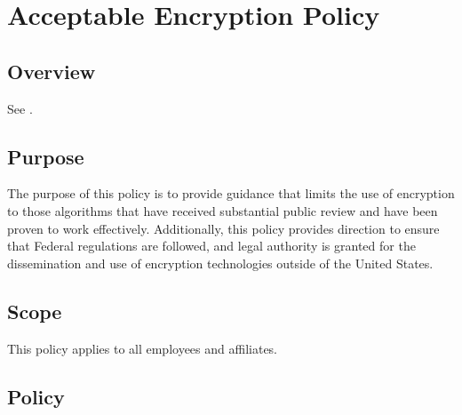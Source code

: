 \chapter{Acceptable Encryption Policy}\label{G:AEP}
\CommonIntroduction



\section{Overview}
See .



\section{Purpose}\label{G:AEP:Pu}
The purpose of this policy is to provide guidance that limits the use of encryption to those algorithms that have received substantial public review and have been proven to work effectively.
Additionally, this policy provides direction to ensure that Federal regulations are followed, and legal authority is granted for the dissemination and use of encryption technologies outside of the United States.



\section{Scope}
This policy applies to all \CompanyName{} employees and affiliates.



\section{Policy}

